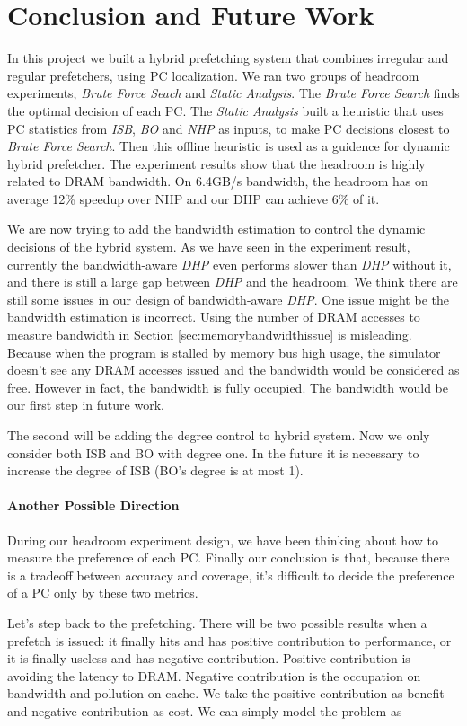 \section{Conclusion and Future Work}
\label{sec:conclusion}

In this project we built a hybrid prefetching system that combines irregular and regular prefetchers, using PC localization.
We ran two groups of headroom experiments, \emph{Brute Force Seach} and \emph{Static Analysis}. The \emph{Brute Force Search} finds the optimal decision of each PC.
The \emph{Static Analysis} built a heuristic that uses PC statistics from \emph{ISB}, \emph{BO} and \emph{NHP} as inputs, to make PC decisions closest to \emph{Brute Force Search}.
Then this offline heuristic is used as a guidence for dynamic hybrid prefetcher.
The experiment results show that the headroom is highly related to DRAM bandwidth. On 6.4GB/s bandwidth, the headroom has on average 12\% speedup over NHP and our DHP can achieve 6\% of it. \par

We are now trying to add the bandwidth estimation to control the dynamic decisions of the hybrid system.
As we have seen in the experiment result, currently the bandwidth-aware \emph{DHP} even performs slower than \emph{DHP} without it, and there is still a large gap between \emph{DHP} and the headroom.
We think there are still some issues in our design of bandwidth-aware \emph{DHP}. One issue might be the bandwidth estimation is incorrect. Using the number of DRAM accesses to measure bandwidth in Section \ref{sec:memorybandwidthissue} is misleading. Because when the program is stalled by memory bus high usage, the simulator doesn't see any DRAM accesses issued and the bandwidth would be considered as free. However in fact, the bandwidth is fully occupied. The bandwidth would be our first step in future work. \par

The second will be adding the degree control to hybrid system. Now we only consider both ISB and BO with degree one. In the future it is necessary to increase the degree of ISB (BO's degree is at most 1).\par

\paragraph{Another Possible Direction}
During our headroom experiment design, we have been thinking about how to measure the preference of each PC. Finally our conclusion is that, because there is a tradeoff between accuracy and coverage, it's difficult to decide the preference of a PC only by these two metrics. \par
Let's step back to the prefetching. There will be two possible results when a prefetch is issued: it finally hits and has positive contribution to performance, or it is finally useless and has negative contribution. Positive contribution is avoiding the latency to DRAM. Negative contribution is the occupation on bandwidth and pollution on cache. We take the positive contribution as benefit and negative contribution as cost. We can simply model the problem as\par

